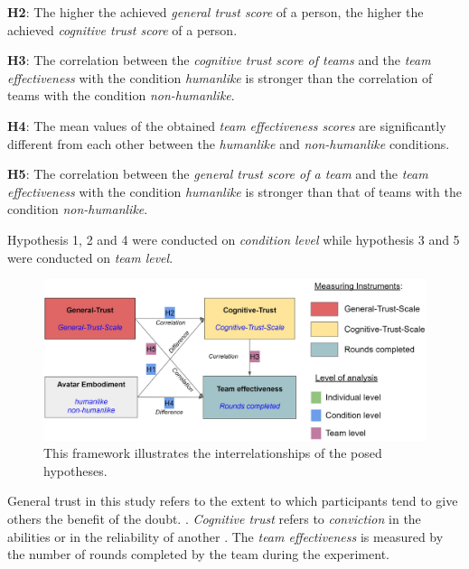 \documentclass[sigchi]{acmart}
\begin{document}
\textbf{H2}: The higher the achieved \textit{general trust score} of a person, the higher the achieved \textit{cognitive trust score} of a person.

\textbf{H3}: The correlation between the \textit{cognitive trust score of teams} and the \textit{team effectiveness} with the condition \textit{humanlike} is stronger than the correlation of teams with the condition \textit{non-humanlike}.

\textbf{H4}: The mean values of the obtained \textit{team effectiveness scores} are significantly different from each other between the \textit{humanlike} and \textit{non-humanlike} conditions.

\textbf{H5}: The correlation between the \textit{general trust score of a team} and the \textit{team effectiveness} with the condition \textit{humanlike} is stronger than that of teams with the condition \textit{non-humanlike}.

Hypothesis 1, 2 and 4 were conducted on \textit{condition level} while hypothesis 3 and 5 were conducted on \textit{team level}.
\begin{figure}[H]
		\begin{footnotesize}
			\includegraphics[width=\linewidth]{Abbildungen/Versuchshypothesen_02.JPG}		
			\caption[The self-constructed framework of experimental hypotheses]{This framework illustrates the interrelationships of the posed hypotheses.}
			\label{Versuchshypothesen}
		\end{footnotesize}
	\end{figure}	

General trust in this study refers to the extent to which participants tend to give others the benefit of the doubt. \citep[p. 30]{mcallister1995affect}.
\textit{Cognitive trust} refers to \textit{conviction} in the abilities or in the reliability of another \citep[p. 30]{mcallister1995affect}.
The \textit{team effectiveness} is measured by the number of rounds completed by the team during the experiment.
\end{document}
